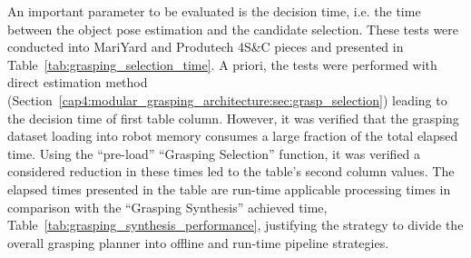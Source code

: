 \begin{table}[h!]
\end{table}

An important parameter to be evaluated is the decision time, i.e. the time between the object pose estimation and the candidate selection. These tests were conducted into MariYard and Produtech 4S\&C pieces and presented in Table~\ref{tab:grasping_selection_time}. A priori, the tests were performed with direct estimation method (Section~\ref{cap4:modular_grasping_architecture:sec:grasp_selection}) leading to the decision time of first table column. However, it was verified that the grasping dataset loading into robot memory consumes a large fraction of the total elapsed time. Using the ``pre-load'' ``Grasping Selection'' function, it was verified a considered reduction in these times led to the table's second column values. The elapsed times presented in the table are run-time applicable processing times in comparison with the ``Grasping Synthesis'' achieved time, Table~\ref{tab:grasping_synthesis_performance}, justifying the strategy to divide the overall grasping planner into offline and run-time pipeline strategies.

